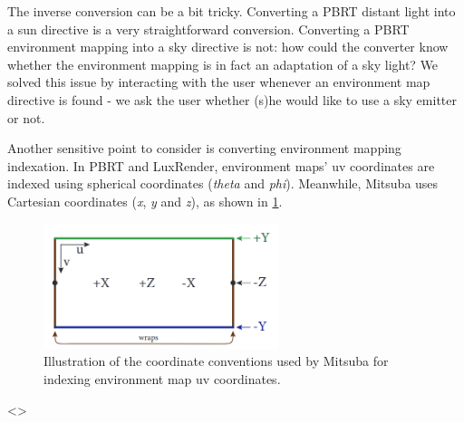 The inverse conversion can be a bit tricky. Converting a PBRT distant light into
a sun directive is a very straightforward conversion. Converting a PBRT
environment mapping into a sky directive is not: how could the converter know
whether the environment mapping is in fact an adaptation of a sky light? We
solved this issue by interacting with the user whenever an environment map
directive is found - we ask the user whether (s)he would like to use a sky
emitter or not.

Another sensitive point to consider is converting environment mapping indexation. In PBRT and LuxRender, environment maps' uv coordinates are indexed using spherical coordinates (\textit{theta} and \textit{phi}). Meanwhile, Mitsuba uses Cartesian coordinates (\textit{x}, \textit{y} and \textit{z}), as shown in \ref{fig:mitdocemitter}. 

\begin{figure}[h]
\centering
\includegraphics[width=2.7in]{figs/3_system_architecture/mitdocemitter.png}
\caption{Illustration of the coordinate conventions used by Mitsuba for indexing environment map uv coordinates.}
\label{fig:mitdocemitter}
\end{figure}

 <>